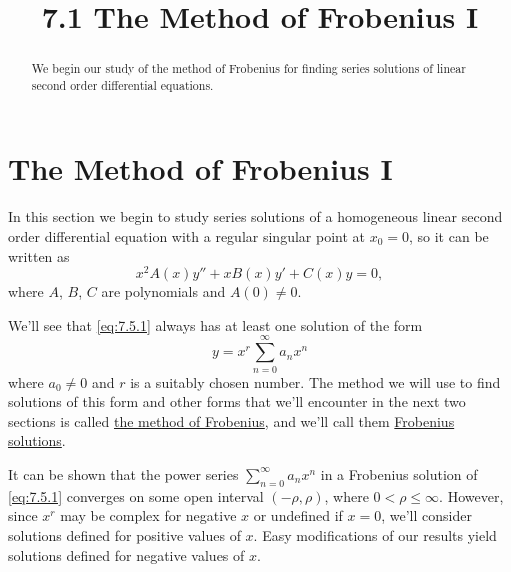\documentclass{ximera}
\title{7.1 The Method of Frobenius I}%
\begin{document}
\begin{abstract}
We begin our study of the method of Frobenius for finding series solutions of linear second order differential equations.
\end{abstract}

\maketitle

\section*{The Method of Frobenius I}

In this section we begin to study  series solutions of a
homogeneous linear second order differential equation with a regular
singular point at $x_0=0$, so it can be written as
\begin{equation} \label{eq:7.5.1}
x^2A(x)y''+xB(x)y'+C(x)y=0,
\end{equation}
where $A$, $B$, $C$ are polynomials and $A(0)\neq 0$.

We'll see that \eqref{eq:7.5.1} always has at least one solution of
the form
$$
y=x^r\sum_{n=0}^\infty a_nx^n
$$
where $a_0\ne0$ and $r$ is a suitably chosen number.
The method  we
will use to find solutions of this form and other forms that we'll
encounter in the next two sections is called
\href{http://www-history.mcs.st-and.ac.uk/Mathematicians/Frobenius.html}{the method of Frobenius},
and we'll call them
\href{http://www-history.mcs.st-and.ac.uk/Mathematicians/Frobenius.html}{Frobenius solutions}.

It can be shown that the power series $\sum_{n=0}^\infty a_nx^n$ in a
Frobenius solution of \eqref{eq:7.5.1} converges on some open interval
$(-\rho,\rho)$, where $0<\rho\leq\infty$. However, since $x^r$ may be
complex for negative $x$ or undefined if $x=0$, we'll consider
solutions defined for positive values of $x$. Easy modifications of
our results yield solutions defined for negative values of $x$.
\end{document}
